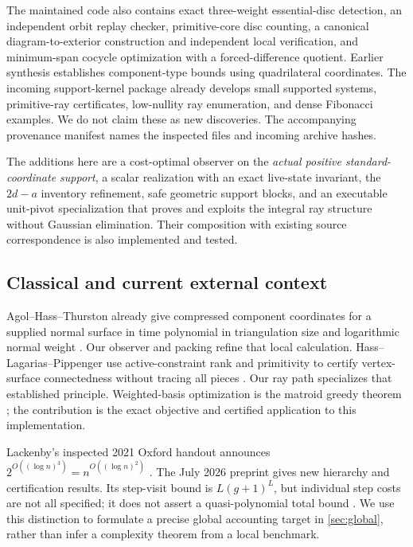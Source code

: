 \documentclass[11pt,a4paper]{article}
\theoremstyle{definition}
\begin{document}
The maintained code also contains exact three-weight essential-disc detection,
an independent orbit replay checker, primitive-core disc counting, a canonical
diagram-to-exterior construction and independent local verification, and
minimum-span cocycle optimization with a forced-difference quotient.  Earlier
synthesis establishes component-type bounds using quadrilateral coordinates.
The incoming support-kernel package already develops small supported systems,
primitive-ray certificates, low-nullity ray enumeration, and dense Fibonacci
examples.  We do not claim these as new discoveries.  The accompanying
provenance manifest names the inspected files and incoming archive hashes.

The additions here are a cost-optimal observer on the \emph{actual positive
standard-coordinate support}, a scalar realization with an exact live-state
invariant, the $2d-a$ inventory refinement, safe geometric support blocks, and
an executable unit-pivot specialization that proves and exploits the integral
ray structure without Gaussian elimination.  Their composition with existing
source correspondence is also implemented and tested.

\subsection{Classical and current external context}

Agol--Hass--Thurston already give compressed component coordinates for a
supplied normal surface in time polynomial in triangulation size and logarithmic
normal weight \cite[Theorem~16, Corollary~17]{AHT06}.  Our observer and packing
refine that local calculation.  Hass--Lagarias--Pippenger use active-constraint
rank and primitivity to certify vertex-surface connectedness without tracing
all pieces \cite[Lemma~5.3, Sections~6 and~8]{HLP99}.  Our ray path specializes
that established principle.  Weighted-basis optimization is the matroid greedy
theorem \cite{Edmonds71}; the contribution is the exact objective and certified
application to this implementation.

Lackenby's inspected 2021 Oxford handout announces
$2^{O((\log n)^3)}=n^{O((\log n)^2)}$ \cite[pp.~7, 25]{Lackenby21Slides}.
The July 2026 preprint gives new hierarchy and certification results.
Its step-visit bound is $L(g+1)^L$, but individual step costs are not all
specified; it does not assert a quasi-polynomial total bound
\cite[Sections~9--10]{Lackenby26}.  We use this distinction to formulate a
precise global accounting target in \cref{sec:global}, rather than infer a
complexity theorem from a local benchmark.
\end{document}
